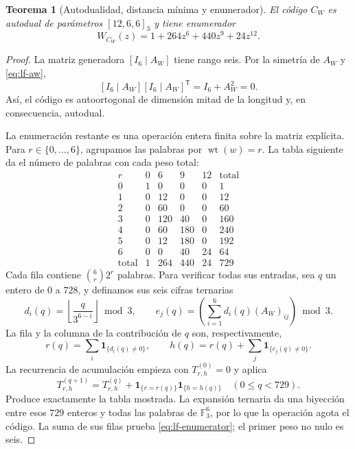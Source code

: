 \documentclass[a4paper,10pt]{article}
\newtheorem{theorem}{Teorema}[section]
\theoremstyle{definition}\newtheorem{definition}[theorem]{Definición}
\theoremstyle{remark}\newtheorem{remark}[theorem]{Observación}
\numberwithin{equation}{section}
\begin{document}
\begin{theorem}[Autodualidad, distancia mínima y enumerador]
\label{thm:lf-code}
El código \(C_W\) es autodual de parámetros \([12,6,6]_3\) y
tiene enumerador
\begin{equation}
 W_{C_W}(z)=1+264z^6+440z^9+24z^{12}.
 \label{eq:lf-enumerator}
\end{equation}
\end{theorem}
\begin{proof}
La matriz generadora \([I_6\mid A_W]\) tiene rango seis.
Por la simetría de \(A_W\) y \eqref{eq:lf-aw},
\[
 [I_6\mid A_W][I_6\mid A_W]^{\mathsf T}
       =I_6+A_W^2=0.
\]
Así, el código es autoortogonal de dimensión mitad de la
longitud y, en consecuencia, autodual.

La enumeración restante es una operación entera finita sobre
la matriz explícita. Para \(r\in\{0,\ldots,6\}\), agrupamos
las palabras por \(\operatorname{wt}(w)=r\). La tabla siguiente
da el número de palabras con cada peso total:
\[
\begin{array}{c|rrrr|r}
r&0&6&9&12&\text{total}\\ \hline
0&1&0&0&0&1\\
1&0&12&0&0&12\\
2&0&60&0&0&60\\
3&0&120&40&0&160\\
4&0&60&180&0&240\\
5&0&12&180&0&192\\
6&0&0&40&24&64\\ \hline
\text{total}&1&264&440&24&729
\end{array}
\]
Cada fila contiene \(\binom6r2^r\) palabras. Para verificar
todas sus entradas, sea \(q\) un entero de \(0\) a \(728\), y
definamos sus seis cifras ternarias
\[
 d_i(q)=\left\lfloor\frac{q}{3^{6-i}}\right\rfloor\bmod3,
 \qquad
 e_j(q)=\left(\sum_{i=1}^{6}d_i(q)(A_W)_{ij}\right)\bmod3.
\]
La fila y la columna de la contribución de \(q\) son,
respectivamente,
\[
 r(q)=\sum_i\mathbf1_{\{d_i(q)\ne0\}},\qquad
 h(q)=r(q)+\sum_j\mathbf1_{\{e_j(q)\ne0\}}.
\]
La recurrencia de acumulación empieza con
\(T^{(0)}_{r,h}=0\) y aplica
\[
 T^{(q+1)}_{r,h}
 =T^{(q)}_{r,h}
   +\mathbf1_{\{r=r(q)\}}\mathbf1_{\{h=h(q)\}}
 \quad(0\leq q<729).
\]
Produce exactamente la tabla mostrada. La expansión ternaria
da una biyección entre esos \(729\) enteros y todas las palabras
de \(\mathbb F_3^6\), por lo que la operación agota el código.
La suma de sus filas prueba \eqref{eq:lf-enumerator}; el primer
peso no nulo es seis.
\end{proof}
\end{document}
